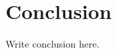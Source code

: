\documentclass[a4paper,11pt,oneside,openany,fleqn]{jsbook}
\begin{document}
    \chapter{Conclusion}
        Write conclusion here.
\end{document}
